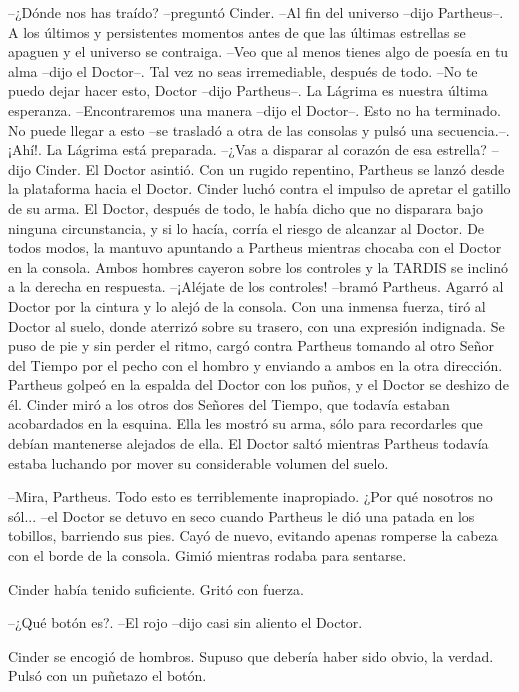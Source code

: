 --¿Dónde nos has traído? --preguntó Cinder.
--Al fin del universo --dijo Partheus--. A los últimos y persistentes momentos antes de que las últimas estrellas se apaguen y el universo se contraiga.
--Veo que al menos tienes algo de poesía en tu alma --dijo el Doctor--. Tal vez no seas irremediable, después de todo.
--No te puedo dejar hacer esto, Doctor --dijo Partheus--. La Lágrima es nuestra última esperanza.
--Encontraremos una manera --dijo el Doctor--. Esto no ha terminado. No puede llegar a esto --se trasladó a otra de las consolas y pulsó una secuencia.--. ¡Ahí!. La Lágrima está preparada.
--¿Vas a disparar al corazón de esa estrella? --dijo Cinder.
El Doctor asintió.
Con un rugido repentino, Partheus se lanzó desde la plataforma hacia el Doctor. Cinder luchó contra el impulso de apretar el gatillo de su arma. El Doctor, después de todo, le había dicho que no disparara bajo ninguna circunstancia, y si lo hacía, corría el riesgo de alcanzar al Doctor. De todos modos, la mantuvo apuntando a Partheus mientras chocaba con el Doctor en la consola.
Ambos hombres cayeron sobre los controles y la TARDIS se inclinó a la derecha en respuesta.
--¡Aléjate de los controles! --bramó Partheus. Agarró al Doctor por la cintura y lo alejó de la consola. Con una inmensa fuerza, tiró al Doctor al suelo, donde aterrizó sobre su trasero, con una expresión indignada.
Se puso de pie y sin perder el ritmo, cargó contra Partheus tomando al otro Señor del Tiempo por el pecho con el hombro y enviando a ambos en la otra dirección. Partheus golpeó en la espalda del Doctor con los puños, y el Doctor se deshizo de él.
Cinder miró a los otros dos Señores del Tiempo, que todavía estaban acobardados en la esquina. Ella les mostró su arma, sólo para recordarles que debían mantenerse alejados de ella.
El Doctor saltó mientras Partheus todavía estaba luchando por mover su considerable volumen del suelo.

--Mira, Partheus. Todo esto es terriblemente inapropiado. ¿Por qué nosotros no sól... --el Doctor se detuvo en seco cuando Partheus le dió una patada en los tobillos, barriendo sus pies. Cayó de nuevo, evitando apenas romperse la cabeza con el borde de la consola. Gimió mientras rodaba para sentarse.

Cinder había tenido suficiente. Gritó con fuerza. 

--¿Qué botón es?.
--El rojo --dijo casi sin aliento el Doctor.

Cinder se encogió de hombros. Supuso que debería haber sido obvio, la verdad. Pulsó con un puñetazo el botón.

